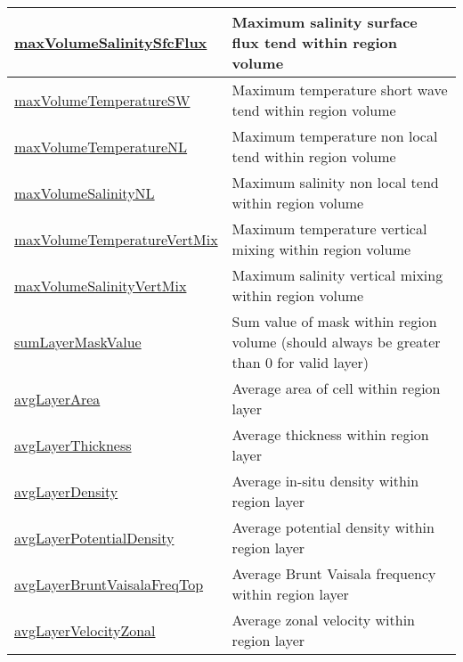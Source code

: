 {\begin{center}
\begin{longtable}{| p{2.0in} | p{4.0in} |}
    \hline
    \hyperref[subsec:var_sec_layerVolumeWeightedAverageAM_maxVolumeSalinitySfcFlux]{maxVolumeSalinitySfcFlux} & Maximum salinity surface flux tend within region volume \\
    \hline
    \hyperref[subsec:var_sec_layerVolumeWeightedAverageAM_maxVolumeTemperatureSW]{maxVolumeTemperatureSW} & Maximum temperature short wave tend within region volume \\
    \hline
    \hyperref[subsec:var_sec_layerVolumeWeightedAverageAM_maxVolumeTemperatureNL]{maxVolumeTemperatureNL} & Maximum temperature non local tend within region volume \\
    \hline
    \hyperref[subsec:var_sec_layerVolumeWeightedAverageAM_maxVolumeSalinityNL]{maxVolumeSalinityNL} & Maximum salinity non local tend within region volume \\
    \hline
    \hyperref[subsec:var_sec_layerVolumeWeightedAverageAM_maxVolumeTemperatureVertMix]{maxVolumeTemperatureVertMix} & Maximum temperature vertical mixing within region volume \\
    \hline
    \hyperref[subsec:var_sec_layerVolumeWeightedAverageAM_maxVolumeSalinityVertMix]{maxVolumeSalinityVertMix} & Maximum salinity vertical mixing within region volume \\
    \hline
    \hyperref[subsec:var_sec_layerVolumeWeightedAverageAM_sumLayerMaskValue]{sumLayerMaskValue} & Sum value of mask within region volume (should always be greater than 0 for valid layer) \\
    \hline
    \hyperref[subsec:var_sec_layerVolumeWeightedAverageAM_avgLayerArea]{avgLayerArea} & Average area of cell within region layer \\
    \hline
    \hyperref[subsec:var_sec_layerVolumeWeightedAverageAM_avgLayerThickness]{avgLayerThickness} & Average thickness within region layer \\
    \hline
    \hyperref[subsec:var_sec_layerVolumeWeightedAverageAM_avgLayerDensity]{avgLayerDensity} & Average in-situ density within region layer \\
    \hline
    \hyperref[subsec:var_sec_layerVolumeWeightedAverageAM_avgLayerPotentialDensity]{avgLayerPotentialDensity} & Average potential density within region layer \\
    \hline
    \hyperref[subsec:var_sec_layerVolumeWeightedAverageAM_avgLayerBruntVaisalaFreqTop]{avgLayerBruntVaisalaFreqTop} & Average Brunt Vaisala frequency within region layer \\
    \hline
    \hyperref[subsec:var_sec_layerVolumeWeightedAverageAM_avgLayerVelocityZonal]{avgLayerVelocityZonal} & Average zonal velocity within region layer \\

\end{longtable}
\end{center}}
